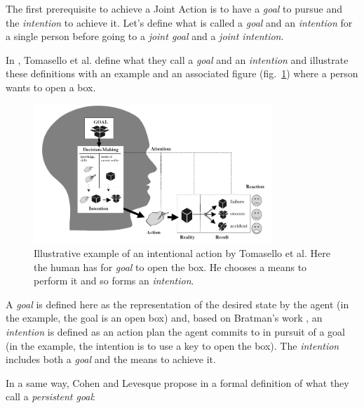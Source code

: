 \documentclass[english,a4paper,11pt,twoside]{StyleThese}
\begin{document}
\label{subsec:commitment}

The first prerequisite to achieve a Joint Action is to have a \textit{goal} to pursue and the \textit{intention} to achieve it. Let's define what is called a \textit{goal} and an \textit{intention} for a single person before going to a \textit{joint goal} and a \textit{joint intention}.

In \cite{tomasello2005understanding}, Tomasello et al. define what they call a \textit{goal} and an \textit{intention} and illustrate these definitions with an example and an associated figure (fig.~\ref{fig:intention}) where a person wants to open a box.

\begin{figure}[!h]
	\centering
    \includegraphics[width=0.8\textwidth]{figs/Chapter1/intention.png}
    \caption{Illustrative example of an intentional action by Tomasello et al. Here the human has for \textit{goal} to open the box. He chooses a means to perform it and so forms an \textit{intention}.}
    \label{fig:intention}
\end{figure}
A \textit{goal} is defined here as the representation of the desired state by the agent (in the example, the goal is an open box) and, based on Bratman's work \cite{bratman1989intention}, an \textit{intention} is defined as an action plan the agent commits to in pursuit of a goal (in the example, the intention is to use a key to open the box). The \textit{intention} includes both a \textit{goal} and the means to achieve it. 

In a same way, Cohen and Levesque propose in \cite{cohen1991teamwork} a formal definition of what they call a \textit{persistent goal}:
\end{document}
